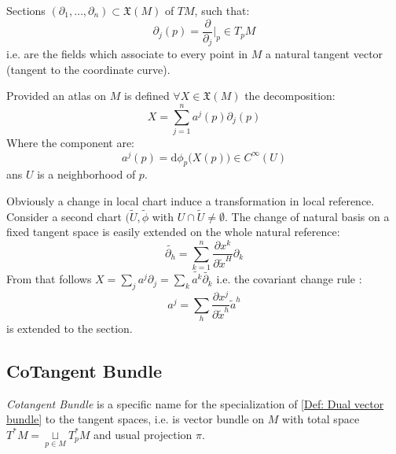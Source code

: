 \documentclass[a4paper,12pt]{scrartcl}    %
\begin{document}
\begin{definition}
Sections  $(\partial_1, \ldots, \partial_n) \subset \mathfrak{X}(M)$ of $TM$, such that:
	\begin{displaymath}
		\partial_j (p) = \frac{\partial}{\partial_j} \big \vert_p \in T_pM
	\end{displaymath}
i.e. are the fields which associate to every point in $M$ a natural tangent vector (tangent to the coordinate curve).
\end{definition}

\begin{observation}
Provided an atlas on $M$ is defined $\forall X \in \mathfrak{X}(M)$ the decomposition:
	\begin{displaymath}
		X= \sum_{j=1}^n a^j(p) \partial_j(p)
	\end{displaymath}
Where the component are:
	\begin{equation}\label{eq: vector fields components}
		a^j(p) = \textrm{d}\phi_p \big( X(p)\big) \in C^\infty(U)
	\end{equation}
ans $U$ is a neighborhood of $p$.
\end{observation}

\begin{observation}
	Obviously a change in local chart induce a transformation in local reference.
	\\
	Consider a second chart $( \tilde{U}, \tilde{\phi}$ with $ U \cap \tilde{U} \neq \emptyset$.
	The change of natural basis on a fixed tangent space is easily extended on the whole natural reference:
	\begin{equation}\label{eq: controvariant basis}
		\tilde{\partial_h} = \sum_{k=1}^n \frac{\partial x^k}{\partial \tilde{x}^H} \partial_k
	\end{equation}
	From that follows $X= \sum_j a^j \partial_j = \sum_k \tilde{a^k} \tilde{\partial_k} $ i.e. the covariant change rule :
	\begin{displaymath}
		a^j = \sum_h \frac{\partial x^j}{\partial \tilde{x}^h} \tilde{a}^h
	\end{displaymath}
	is extended to the section.
\end{observation}	
	
\subsection{CoTangent Bundle}
\begin{notationfix}
\emph{Cotangent Bundle} is a specific name for the specialization of \ref{Def: Dual vector bundle} to the tangent spaces, i.e. is vector bundle on $M$ with total space $T^*M = \underset{p \in M}{\sqcup}T^*_p M  $ and usual projection $\pi$.
\end{notationfix}
\end{document}

